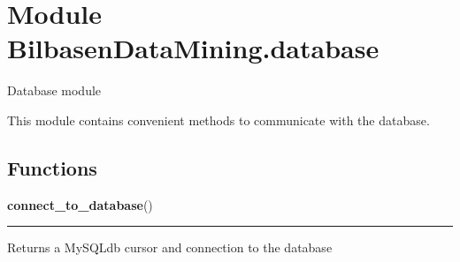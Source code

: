 %
%
%


\section{Module BilbasenDataMining.database}

    \label{BilbasenDataMining:database}
Database module

This module contains convenient methods to communicate with the database.



  \subsection{Functions}

    \label{BilbasenDataMining:database:connect_to_database}

    \vspace{0.5ex}

\hspace{.8\funcindent}\begin{boxedminipage}{\funcwidth}

    \raggedright \textbf{connect\_to\_database}()

    \vspace{-1.5ex}

    \rule{\textwidth}{0.5\fboxrule}
\setlength{\parskip}{2ex}
    Returns a MySQLdb cursor and connection to the database

\setlength{\parskip}{1ex}
    \end{boxedminipage}

    \label{BilbasenDataMining:database:check_if_table_exist}

